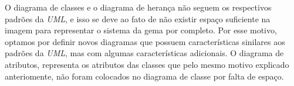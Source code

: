 O diagrama de classes e o diagrama de herança não seguem os respectivos padrões da \emph{UML}, e isso se
deve ao fato de não existir espaço suficiente na imagem para representar o sistema da gema por completo.
Por esse motivo, optamos por definir novos diagramas que possuem características sinilares aos padrões
da \emph{UML}, mas com algumas características adicionais. O diagrama de atributos, representa os atributos
das classes que pelo mesmo motivo explicado anteriomente, não foram colocados no diagrama de classe por
falta de espaço.

